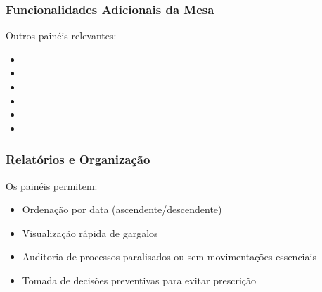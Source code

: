 \documentclass[letterpaper,10pt,brazil]{sphinxmanual}
\begin{document}
\subsubsection{Funcionalidades Adicionais da Mesa}
\label{\detokenize{projud_61_acompanhamentoprescricao:funcionalidades-adicionais-da-mesa}}
\sphinxAtStartPar
Outros painéis relevantes:
\begin{itemize}
\item {} 
\sphinxAtStartPar
{}

\item {} 
\sphinxAtStartPar
{}

\item {} 
\sphinxAtStartPar
{}

\item {} 
\sphinxAtStartPar
{}

\item {} 
\sphinxAtStartPar
{}

\item {} 
\sphinxAtStartPar
{}

\end{itemize}


\subsubsection{Relatórios e Organização}
\label{\detokenize{projud_61_acompanhamentoprescricao:relatorios-e-organizacao}}
\sphinxAtStartPar
Os painéis permitem:
\begin{itemize}
\item {} 
\sphinxAtStartPar
Ordenação por data (ascendente/descendente)

\item {} 
\sphinxAtStartPar
Visualização rápida de gargalos

\item {} 
\sphinxAtStartPar
Auditoria de processos paralisados ou sem movimentações essenciais

\item {} 
\sphinxAtStartPar
Tomada de decisões preventivas para evitar prescrição

\end{itemize}
\end{document}
